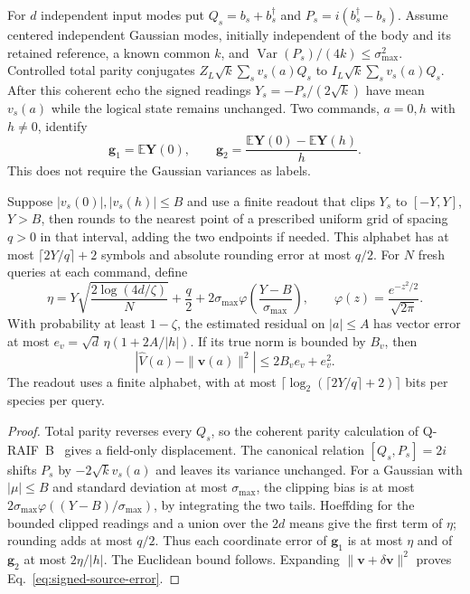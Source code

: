 \begin{proposition}
\label{prop:signed-source-calibration}
For $d$ independent input modes put $Q_s=b_s+b_s^\dagger$ and
$P_s=i(b_s^\dagger-b_s)$. Assume centered independent Gaussian modes,
initially independent of the body and its retained reference,
a known common $k$, and $\operatorname{Var}(P_s)/(4k)\le\sigma_{\max}^2$.
Controlled total parity conjugates
$Z_L\sqrt{k}\sum_s v_s(a)Q_s$ to
$I_L\sqrt{k}\sum_s v_s(a)Q_s$. After this coherent echo the signed
readings $Y_s=-P_s/(2\sqrt{k})$ have mean $v_s(a)$ while the logical
state remains unchanged. Two commands, $a=0,h$ with $h\ne0$, identify
\[
 \mathbf g_1=\mathbb E\mathbf Y(0),\qquad
 \mathbf g_2=\frac{\mathbb E\mathbf Y(0)-\mathbb E\mathbf Y(h)}h.
\]
This does not require the Gaussian variances as labels.

Suppose $|v_s(0)|,|v_s(h)|\le B$ and use a finite readout that clips $Y_s$
to $[-Y,Y]$, $Y>B$, then rounds to the nearest point of a prescribed
uniform grid of spacing $q>0$ in that interval, adding the two endpoints
if needed. This alphabet has at most $\lceil2Y/q\rceil+2$ symbols and
absolute rounding error at most $q/2$.
For $N$ fresh queries at each command, define
\[
 \eta=Y\sqrt{\frac{2\log(4d/\zeta)}N}+\frac q2+
       2\sigma_{\max}\varphi\!\left(\frac{Y-B}{\sigma_{\max}}\right),
 \qquad \varphi(z)=\frac{e^{-z^2/2}}{\sqrt{2\pi}}.
\]
With probability at least $1-\zeta$, the estimated residual on $|a|\le A$
has vector error at most $e_v=\sqrt d\,\eta(1+2A/|h|)$.
If its true norm is bounded by $B_v$, then
\begin{equation}
 |\widehat V(a)-\|\mathbf v(a)\|^2|\le2B_ve_v+e_v^2.
 \label{eq:signed-source-error}
\end{equation}
The readout uses a finite alphabet, with at most
$\lceil\log_2(\lceil2Y/q\rceil+2)\rceil$ bits per species per query.
\end{proposition}
\begin{proof}
Total parity reverses every $Q_s$, so the coherent parity calculation of
Q-RAIF~B~\cite{Liu2026QRAIFB} gives a field-only displacement.
The canonical relation $[Q_s,P_s]=2i$ shifts $P_s$ by
$-2\sqrt{k}v_s(a)$ and leaves its variance unchanged.
For a Gaussian with $|\mu|\le B$ and standard deviation at most
$\sigma_{\max}$, the clipping bias is at most
$2\sigma_{\max}\varphi((Y-B)/\sigma_{\max})$, by integrating the two
tails. Hoeffding for the bounded clipped readings and a union over the
$2d$ means give the first term of $\eta$; rounding adds at most $q/2$.
Thus each coordinate error of $\mathbf g_1$ is at most $\eta$ and of
$\mathbf g_2$ at most $2\eta/|h|$. The Euclidean bound follows.
Expanding $\|\mathbf v+\delta\mathbf v\|^2$ proves
Eq.~\eqref{eq:signed-source-error}.
\end{proof}

